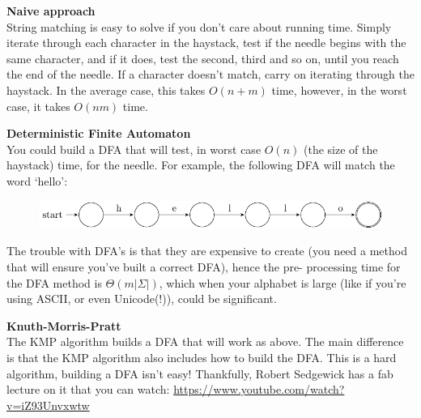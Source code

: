 \begin{description}
  \item \textbf{Naive approach}\\
    String matching is easy to solve if you don't care about running time.
    Simply iterate through each character in the haystack, test if the needle
    begins with the same character, and if it does, test the second, third and
    so on, until you reach the end of the needle. If a character doesn't match,
    carry on iterating through the haystack. In the average case, this takes
    $O(n + m)$ time, however, in the worst case, it takes $O(nm)$ time.

  \item \textbf{Deterministic Finite Automaton}\\
    You could build a DFA that will test, in worst case $O(n)$ (the size of the
    haystack) time, for the needle. For example, the following DFA will match
    the word `hello':

    \begin{figure}[H]
      \centering
      \includegraphics[width=\textwidth]{diagrams/hello-automata.pdf}
      \label{hello-automata}
    \end{figure}


    The trouble with DFA's is that they are expensive to create (you need a
    method that will ensure you've built a correct DFA), hence the pre-
    processing time for the DFA method is $\Theta(m |\Sigma|)$, which when your
    alphabet is large (like if you're using ASCII, or even Unicode(!)), could be
    significant.

  \item \textbf{Knuth-Morris-Pratt}\\
    The KMP algorithm builds a DFA that will work as above. The main difference
    is that the KMP algorithm also includes how to build the DFA. This is a hard
    algorithm, building a DFA isn't easy! Thankfully, Robert Sedgewick has a fab
    lecture on it that you can watch:
    \url{https://www.youtube.com/watch?v=iZ93Unvxwtw}

\end{description}


